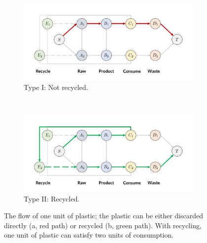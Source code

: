 \begin{figure}
\centering
\begin{subfigure}{0.47\textwidth}
    \centering
    \includegraphics[width=\textwidth]{figures/data-open-type_1.pdf}
    \caption{Type I: Not recycled.}
\end{subfigure}
~
\begin{subfigure}{0.47\textwidth}
    \centering
    \includegraphics[width=\textwidth]{figures/data-open-type_2.pdf}
    \caption{Type II: Recycled.}
\end{subfigure}
\caption{The flow of one unit of plastic; the plastic can be either discarded directly (a, red path) or recycled (b, green path). With recycling, one unit of plastic can satisfy two units of consumption.}
\label{fig:example}
\end{figure}

